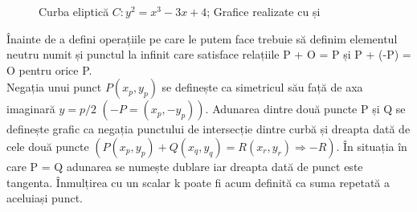 \begin{figure}[H]
    \centering
    \qquad
    \caption{Curba eliptică $C: y^2 = x^3 - 3x + 4$; Grafice realizate cu \cite{WolframAlpha} și \cite{Graui}}
\end{figure}

Înainte de a defini operațiile pe care le putem face trebuie să definim elementul neutru numit și punctul la infinit care satisface relațiile P + O = P și P + (-P) = O pentru orice P.\\

Negația unui punct $P(x_p,y_p)$ se definește ca simetricul său față de axa imaginară $y = p/2$ $( -P = (x_p, -y_p) )$. Adunarea dintre două puncte P și Q se definește grafic ca negația punctului de intersecție dintre curbă și dreapta dată de cele două puncte $(P(x_p, y_p) + Q(x_q, y_q) = R(x_r, y_r) \Rightarrow -R)$. În situația în care P = Q adunarea se numește dublare iar dreapta dată de punct este tangenta. Înmulțirea cu un scalar k poate fi acum definită ca suma repetată a aceluiași punct.\\

